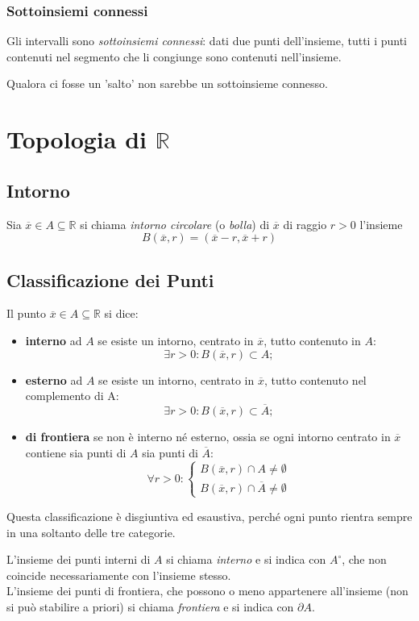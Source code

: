 \documentclass[a4paper,12pt, oneside]{book}
\begin{document}
\subsubsection{Sottoinsiemi connessi}
Gli intervalli sono \textit{sottoinsiemi connessi}: dati due punti dell'insieme, tutti i punti contenuti nel segmento che li congiunge sono contenuti nell'insieme.
\begin{osservazione}
Qualora ci fosse un 'salto' non sarebbe un sottoinsieme connesso.
\end{osservazione}
\section{Topologia di $\mathbb{R}$}
\subsection{Intorno}
\begin{definizione}
Sia $\overline{x} \in A \subseteq \mathbb{R}$ si chiama \emph{intorno circolare} (o \emph{bolla}) di $\overline{x}$ di raggio $r > 0$ l'insieme
\begin{equation}
B(\overline{x},r)= (\overline{x} - r, \overline{x} + r)
\end{equation}
\end{definizione}
\subsection{Classificazione dei Punti}
Il punto $\overline{x}\in A \subseteq \mathbb{R}$ si dice:
\begin{itemize}
\item \textbf{interno} ad $A$ se esiste un intorno, centrato in $\overline{x}$, tutto contenuto in $A$: $$\exists r>0\colon B(\overline{x},r)\subset A;$$
\item \textbf{esterno} ad $A$ se esiste un intorno, centrato in $\overline{x}$, tutto contenuto nel complemento di A: $$\exists r>0\colon B(\overline{x},r)\subset\overline{A};$$
\item \textbf{di frontiera} se non è interno né esterno, ossia se ogni intorno centrato in $\overline{x}$ contiene sia punti di $A$ sia punti di $\overline{A}$:
$$\forall r>0:\left\{
                \begin{array}{ll}
					B(\overline{x},r)\cap A\neq\emptyset\\
					B(\overline{x},r)\cap\overline{A}\neq\emptyset
				\end{array}
				\right.$$
\end{itemize}
\begin{osservazione}
	Questa classificazione è disgiuntiva ed esaustiva, perché ogni punto rientra sempre in una soltanto delle tre categorie.	
\end{osservazione}
\begin{shaded}
L'insieme dei punti interni di $A$ si chiama \emph{interno} e si indica con ${A}^{\circ}$, che non coincide necessariamente con l'insieme stesso.\\

L'insieme dei punti di frontiera, che possono o meno appartenere all'insieme (non si può stabilire a priori) si chiama \emph{frontiera} e si indica con $\partial A$.
\end{shaded}
\end{document}
